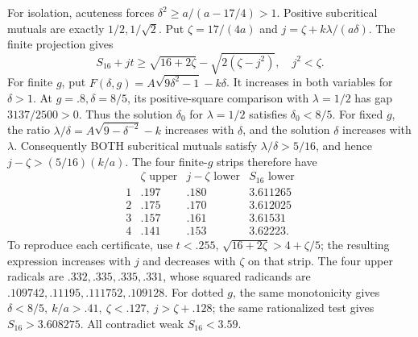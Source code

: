 For isolation, acuteness forces
\(\delta^2\geq a/(a-17/4)>1\).
Positive subcritical mutuals are exactly \(1/2,1/\sqrt2\).
Put \(\zeta=17/(4a)\) and
\(j=\zeta+k\lambda/(a\delta)\).
The finite projection gives
\[
 S_{16}+jt\geq\sqrt{16+2\zeta}-\sqrt{2(\zeta-j^2)},\quad j^2<\zeta .
\]
For finite \(g\), put
\(F(\delta,g)=A\sqrt{9\delta^2-1}-k\delta\).
It increases in both variables for \(\delta>1\).
At \(g=.8,\delta=8/5\), its positive-square comparison with
\(\lambda=1/2\) has gap \(3137/2500>0\).
Thus the solution \(\delta_0\) for \(\lambda=1/2\) satisfies
\(\delta_0<8/5\).
For fixed \(g\), the ratio
\(\lambda/\delta=A\sqrt{9-\delta^{-2}}-k\)
increases with \(\delta\), and the solution \(\delta\)
increases with \(\lambda\).
Consequently BOTH subcritical mutuals satisfy
\(\lambda/\delta>5/16\), and hence
\(j-\zeta>(5/16)(k/a)\).
The four finite-\(g\) strips therefore have
\[
\begin{array}{c|c|c|c}
 &\zeta\text{ upper}&j-\zeta\text{ lower}&S_{16}\text{ lower}\\ \hline
1&.197&.180&3.611265\\
2&.175&.170&3.612025\\
3&.157&.161&3.61531\\
4&.141&.153&3.62223 .
\end{array}
\]
To reproduce each certificate, use \(t<.255\),
\(\sqrt{16+2\zeta}>4+\zeta/5\);
the resulting expression increases with \(j\) and decreases with
\(\zeta\) on that strip.
The four upper radicals are \(.332,.335,.335,.331\),
whose squared radicands are
\(.109742,.11195,.111752,.109128\).
For dotted \(g\), the same monotonicity gives
\(\delta<8/5,\ k/a>.41,\ \zeta<.127,\ j>\zeta+.128\);
the same rationalized test gives \(S_{16}>3.608275\).
All contradict weak \(S_{16}<3.59\).


